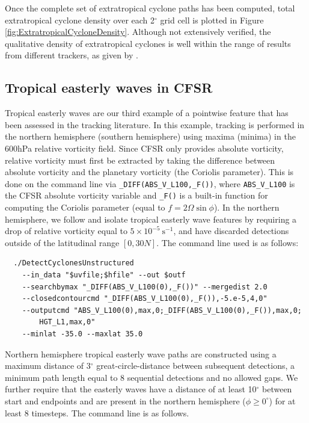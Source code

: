 \documentclass[gmdd, hvmath, online]{copernicus_discussions}
\begin{document}
Once the complete set of extratropical cyclone paths has been computed, total extratropical cyclone density over each 2$^\circ$ grid cell is plotted in Figure \ref{fig:ExtratropicalCycloneDensity}.  Although not extensively verified, the qualitative density of extratropical cyclones is well within the range of results from different trackers, as given by \cite{neu2013imilast}.

\subsection{Tropical easterly waves in CFSR} \label{sec:TropicalEasterlyWavesExample}


Tropical easterly waves are our third example of a pointwise feature that has been assessed in the tracking literature.  In this example, tracking is performed in the northern hemisphere (southern hemisphere) using maxima (minima) in the 600hPa relative vorticity field.  Since CFSR only provides absolute vorticity, relative vorticity must first be extracted by taking the difference between absolute vorticity and the planetary vorticity (the Coriolis parameter).  This is done on the command line via \texttt{\_DIFF(ABS\_V\_L100,\_F())}, where \texttt{ABS\_V\_L100} is the CFSR absolute vorticity variable and \texttt{\_F()} is a built-in function for computing the Coriolis parameter (equal to $f = 2 \Omega \sin \phi$).  In the northern hemisphere, we follow \cite{thorncroft2001african} and isolate tropical easterly wave features by requiring a drop of relative vorticity equal to $5 \times 10^{-5}\ \mbox{s}^{-1}$, and have discarded detections outside of the latitudinal range $[0, 30N]$.  The command line used is as follows:

{\small \begin{verbatim}
  ./DetectCyclonesUnstructured
    --in_data "$uvfile;$hfile" --out $outf
    --searchbymax "_DIFF(ABS_V_L100(0),_F())" --mergedist 2.0
    --closedcontourcmd "_DIFF(ABS_V_L100(0),_F()),-5.e-5,4,0"
    --outputcmd "ABS_V_L100(0),max,0;_DIFF(ABS_V_L100(0),_F()),max,0;
        HGT_L1,max,0"
    --minlat -35.0 --maxlat 35.0 
\end{verbatim}}

Northern hemisphere tropical easterly wave paths are constructed using a maximum distance of 3$^\circ$ great-circle-distance between subsequent detections, a minimum path length equal to 8 sequential detections and no allowed gaps.  We further require that the easterly waves have a distance of at least 10$^\circ$ between start and endpoints and are present in the northern hemisphere ($\phi \geq 0^\circ$) for at least 8 timesteps.  The command line is as follows.
\end{document}
